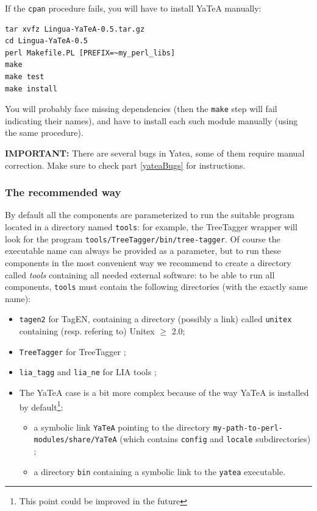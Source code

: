\documentclass{article}
\newenvironment{xitemize}{
\begin{itemize}
  \setlength{\itemsep}{.3\baselineskip}
  \setlength{\topsep}{0pt}
  \setlength{\parskip}{0pt}
  \setlength{\parsep}{0pt}
}{\end{itemize}}
\begin{document}
If the {\tt cpan} procedure fails, you will have to install YaTeA manually:


\begin{verbatim}
tar xvfz Lingua-YaTeA-0.5.tar.gz
cd Lingua-YaTeA-0.5
perl Makefile.PL [PREFIX=~my_perl_libs]
make
make test
make install
\end{verbatim}

You will probably face missing dependencies (then the {\tt make} step will fail indicating their names), and have to install each such module manually (using the same procedure).

{\bf IMPORTANT:} There are several bugs in Yatea, some of them require manual correction. Make sure to check part \ref{yateaBugs} for instructions.

\subsubsection{The recommended way}

By default all the components are parameterized to run the suitable program located in a directory named {\tt tools}: for example, the TreeTagger wrapper will look for the program {\tt tools/TreeTagger/bin/tree-tagger}. Of course the executable name can always be provided as a parameter, but to run these components in the most convenient way we recommend to create a directory called {\em tools} containing all needed external software: to be able to run all components, {\tt tools} must contain the following directories (with the exactly same name):
\begin{xitemize}
\item {\tt tagen2} for TagEN, containing a directory (possibly a link) called {\tt unitex} containing (resp. refering to) Unitex $\geq$ 2.0;
\item {\tt TreeTagger} for TreeTagger ;
\item {\tt lia\_tagg} and {\tt lia\_ne} for LIA tools ;
\item The YaTeA case is a bit more complex because of the way YaTeA is installed by default\footnote{This point could be improved in the future}: 
\begin{xitemize}
\item a symbolic link {\tt YaTeA} pointing to the directory  {\tt my-path-to-perl-modules/share/YaTeA} (which contains {\tt config} and {\tt locale} subdirectories) ;
\item a directory {\tt bin} containing a symbolic link to the {\tt yatea} executable.
\end{xitemize}
\end{xitemize}
\end{document}
